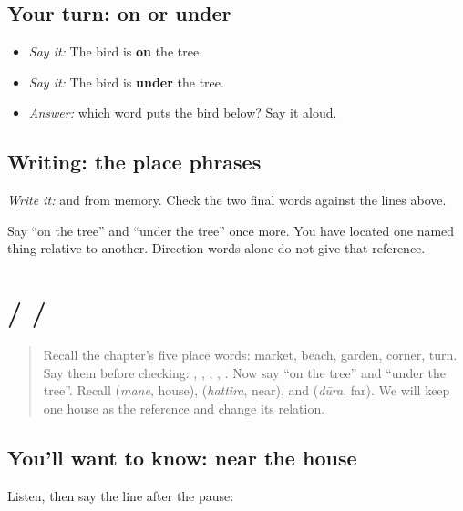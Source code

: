 \subsection*{Your turn: on or under}
\begin{itemize}
\raggedright
  \item \emph{Say it:} The bird is \textbf{on} the tree.
  \item \emph{Say it:} The bird is \textbf{under} the tree.
  \item \emph{Answer:} which word puts the bird below? Say it aloud.
\end{itemize}

\subsection*{Writing: the place phrases}
\emph{Write it:} \textbf{ } and \textbf{ } from memory. Check the two final words against the lines above.

\begin{tcolorbox}[breakable,colback=teal!4,colframe=teal!35!black,title={Before you move on}]
Say “on the tree” and “under the tree” once more. You have located one named thing relative to another. Direction words alone do not give that reference.
\end{tcolorbox}
\section[\texorpdfstring{\kn{ಶಾಲೆ} \kn{ಮನೆಯ} \kn{ಹತ್ತಿರ} \kn{ಇದೆ}. (śāle maneya …)}{ಶಾಲೆ ಮನೆಯ ಹತ್ತಿರ ಇದೆ. (śāle maneya …)}]{  /   / }

\label{lesson:KA-C110-house-near-far-inside}



\begin{quote}
Recall the chapter's five place words: market, beach, garden, corner, turn. Say them before checking: \textbf{}, \textbf{}, \textbf{}, \textbf{}, \textbf{}. Now say “on the tree” and “under the tree”. Recall \textbf{} (\emph{mane}, house), \textbf{} (\emph{hattira}, near), and \textbf{} (\emph{dūra}, far). We will keep one house as the reference and change its relation.
\end{quote}

\subsection*{You'll want to know: near the house}
Listen, then say the line after the pause:


